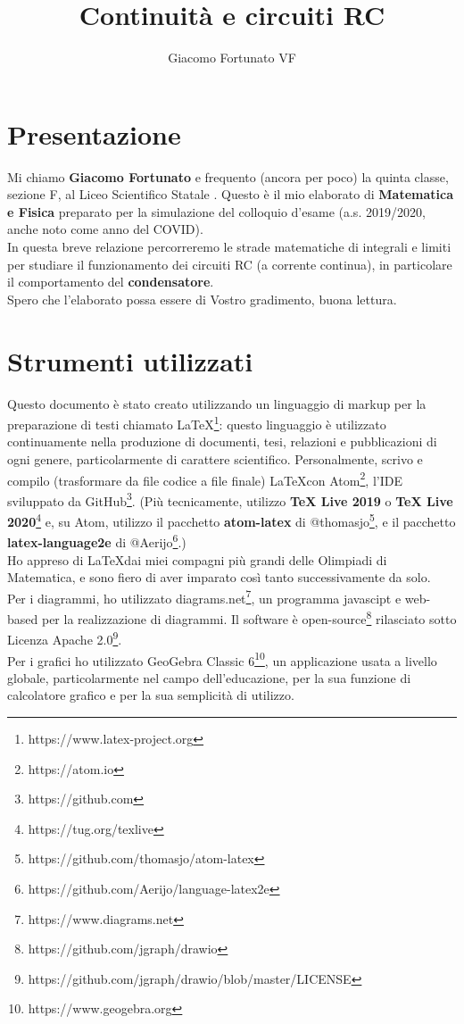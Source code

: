 \documentclass[a3paper, twoside, openany]{book}
\title{Continuità e circuiti RC}
\author{Giacomo Fortunato VF}
\theoremstyle{definition}
\begin{document}
\maketitle
\section{Presentazione}
Mi chiamo \textbf{Giacomo Fortunato} e frequento (ancora per poco) la quinta classe, sezione F, al Liceo Scientifico Statale . Questo è il mio elaborato di \textbf{Matematica e Fisica} preparato per la simulazione del colloquio d'esame (a.s. 2019/2020, anche noto come anno del COVID). \\ In questa breve relazione percorreremo le strade matematiche di integrali e limiti per studiare il funzionamento dei circuiti RC (a corrente continua), in particolare il comportamento del \textbf{condensatore}. \\ Spero che l'elaborato possa essere di Vostro gradimento, buona lettura.
\section{Strumenti utilizzati}
Questo documento è stato creato utilizzando un linguaggio di markup per la preparazione di testi chiamato \LaTeX\footnote{https://www.latex-project.org}: questo linguaggio è utilizzato continuamente nella produzione di documenti, tesi, relazioni e pubblicazioni di ogni genere, particolarmente di carattere scientifico. Personalmente, scrivo e compilo (trasformare da file codice a file finale) \LaTeX con Atom\footnote{https://atom.io}, l'IDE sviluppato da GitHub\footnote{https://github.com}. (Più tecnicamente, utilizzo \textbf{TeX Live 2019} o \textbf{TeX Live 2020}\footnote{https://tug.org/texlive} e, su Atom, utilizzo il pacchetto \textbf{atom-latex} di @thomasjo\footnote{https://github.com/thomasjo/atom-latex}, e il pacchetto \mbox{\textbf{latex-language2e}} di @Aerijo\footnote{https://github.com/Aerijo/language-latex2e}.) \\ Ho appreso di \LaTeX dai miei compagni più grandi delle Olimpiadi di Matematica, e sono fiero di aver imparato così tanto successivamente da solo. \\ Per i diagrammi, ho utilizzato diagrams.net\footnote{https://www.diagrams.net}, un programma javascipt e web-based per la realizzazione di diagrammi. Il software è open-source\footnote{https://github.com/jgraph/drawio} rilasciato sotto Licenza Apache 2.0\footnote{https://github.com/jgraph/drawio/blob/master/LICENSE}. \\ Per i grafici ho utilizzato GeoGebra Classic 6\footnote{https://www.geogebra.org}, un applicazione usata a livello globale, particolarmente nel campo dell'educazione, per la sua funzione di calcolatore grafico e per la sua semplicità di utilizzo.
\end{document}
